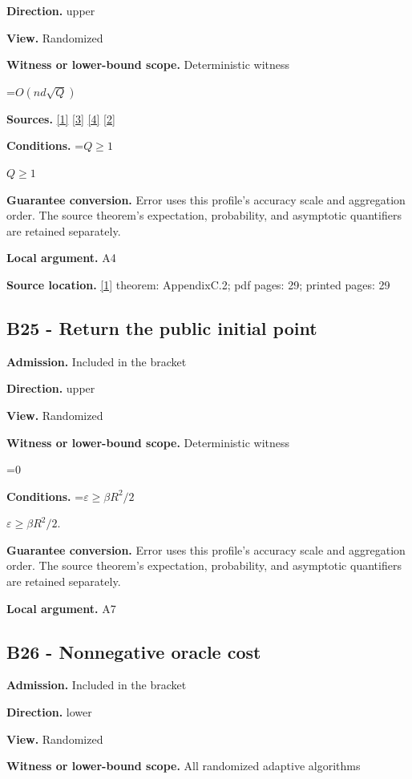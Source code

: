 \documentclass[10pt,a4paper]{article}
\newcommand{\AtlasMath}[1]{\par\begingroup\centering\setbox0=\hbox{$\displaystyle #1$}\ifdim\wd0>1.4\linewidth\typeout{ATLAS WIDE FORMULA: \the\wd0}\fi\ifdim\wd0>\linewidth\resizebox{\linewidth}{!}{\box0}\else\box0\fi\par\endgroup}
\newcommand{\AtlasInlineMath}[1]{\begingroup\setbox0=\hbox{$#1$}\ifdim\wd0>.4\linewidth\endgroup\AtlasMath{#1}\else\endgroup$#1$\fi}
\begin{document}
\textbf{Direction.} upper

\textbf{View.} Randomized

\textbf{Witness or lower-bound scope.} Deterministic witness

\AtlasMath{O(nd\sqrt Q)}
\textbf{Sources.} \href{https://arxiv.org/html/2610.00345v1}{[1]} \href{https://arxiv.org/html/2607.16558v2}{[3]} \href{https://www.mathnet.ru/php/archive.phtml?jrnid=mzm&option_lang=eng&paperid=1697&wshow=paper}{[4]} \href{https://arxiv.org/abs/2109.08858}{[2]}

\textbf{Conditions.} \AtlasInlineMath{Q\ge1}

\textbf{Guarantee conversion.} Error uses this profile's accuracy scale and aggregation order. The source theorem's expectation, probability, and asymptotic quantifiers are retained separately.

\textbf{Local argument.} A4

\textbf{Source location.} \href{https://arxiv.org/html/2610.00345v1}{[1]} theorem: AppendixC.2; pdf pages: 29; printed pages: 29

\subsection{B25 - Return the public initial point}
\textbf{Admission.} Included in the bracket

\textbf{Direction.} upper

\textbf{View.} Randomized

\textbf{Witness or lower-bound scope.} Deterministic witness

\AtlasMath{0}
\textbf{Conditions.} \AtlasInlineMath{\varepsilon\ge\beta R^2/2}.

\textbf{Guarantee conversion.} Error uses this profile's accuracy scale and aggregation order. The source theorem's expectation, probability, and asymptotic quantifiers are retained separately.

\textbf{Local argument.} A7

\subsection{B26 - Nonnegative oracle cost}
\textbf{Admission.} Included in the bracket

\textbf{Direction.} lower

\textbf{View.} Randomized

\textbf{Witness or lower-bound scope.} All randomized adaptive algorithms
\end{document}
